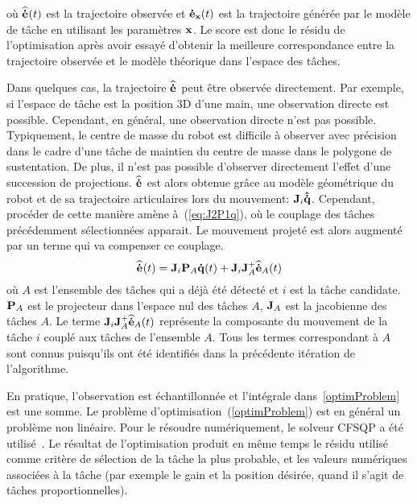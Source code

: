 \noindent où ${\mathbf{\widehat{\dot{e}}}}_{}(t)$ est la trajectoire observée et ${\mathbf{\dot{e}}}_{{\mathbf{x}}}(t)$ est la trajectoire
générée par le modèle de t\^ache en utilisant les paramètres ${\mathbf{x}}$.
Le score est donc le résidu de l'optimisation après avoir essayé d'obtenir la meilleure correspondance 
entre la trajectoire observée et le modèle théorique dans l'espace des t\^aches.

Dans quelques cas, la trajectoire ${\mathbf{\widehat{\dot{e}}}}_{}$ peut \^etre observée directement.
Par exemple, si l'espace de t\^ache est la position 3D d'une main, une observation
directe est possible. Cependant, en général, une observation directe n'est pas possible.
Typiquement, le centre de masse du robot est difficile à observer avec précision dans le cadre d'une t\^ache
de maintien du centre de masse dans le polygone de sustentation.
De plus, il n'est pas possible d'observer directement l'effet d'une succession de projections.
${\mathbf{\widehat{\dot{e}}}}_{}$ est alors obtenue gr\^ace au modèle géométrique du robot et
de sa trajectoire articulaires lors du mouvement: ${\mathbf{J}}_i{\mathbf{\hat{\dot{q}}}}$.
Cependant, procéder de cette manière amène à~(\ref{eq:J2P1q}), où le couplage
des t\^aches précédemment sélectionnées apparait.
Le mouvement projeté est alors augmenté par un terme qui va compenser ce couplage.
\begin{equation}
  \medoth{}(t) = \mbf{J}_i\mbf{P}_A \mbf{\dot{q}}(t) + \mbf{J}_i\mbf{J}_A^+\medoth{A}(t)
  \label{eq:compensation}
\end{equation}
où $A$ est l'ensemble des t\^aches qui a déjà été détecté et $i$ est la t\^ache candidate.
${\mathbf{P}}_A$ est le projecteur dans l'espace nul des t\^aches $A$, ${\mathbf{J}}_A$ est 
la jacobienne des t\^aches $A$. Le terme ${\mathbf{J}}_i{\mathbf{J}}_A^+{\mathbf{\widehat{\dot{e}}}}_{A}(t)$ représente la 
composante du mouvement de la t\^ache $i$ couplé aux t\^aches de l'ensemble $A$.
Tous les termes correspondant à $A$ sont connus puisqu'ils ont été identifiés
dans la précédente itération de l'algorithme.

\medskip
En pratique, l'observation est échantillonnée et l'intégrale dans~\eqref{optimProblem} est une somme.
Le problème d'optimisation~(\ref{optimProblem}) est en général un problème non
linéaire. Pour le résoudre numériquement, le solveur CFSQP
a été utilisé~\cite{lawrence97}. Le résultat de l'optimisation produit
en même temps le résidu utilisé comme critère de sélection de la t\^ache la plus probable,
et les valeurs numériques associées à la t\^ache (par exemple le gain et la position désirée, quand il
s'agit de t\^aches proportionnelles).

